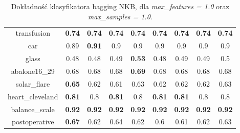 \begin{table}[H]
\begin{center}
{\begin{tabular}{c|cccccccc}
				transfusion&\textbf{0.74}&\textbf{0.74}&\textbf{0.74}&\textbf{0.74}&\textbf{0.74}&\textbf{0.74}&\textbf{0.74}&\textbf{0.74}\\%
				
				car&0.89&\textbf{0.91}&0.9&0.9&0.9&0.9&0.9&0.9\\%
				
				glass&0.48&0.48&0.49&\textbf{0.53}&0.48&0.49&0.49&0.5\\%
				
				abalone16\_29&0.68&0.68&0.68&\textbf{0.69}&0.68&0.68&0.68&0.68\\%
				
				solar\_flare&\textbf{0.65}&0.62&0.61&0.63&0.62&0.62&0.62&0.63\\%
				
				heart\_cleveland&\textbf{0.81}&0.8&\textbf{0.81}&0.8&\textbf{0.81}&\textbf{0.81}&0.8&0.8\\%
				
				balance\_scale&\textbf{0.92}&\textbf{0.92}&\textbf{0.92}&\textbf{0.92}&\textbf{0.92}&\textbf{0.92}&\textbf{0.92}&\textbf{0.92}\\%
				
				postoperative&\textbf{0.67}&0.62&0.64&0.62&0.6&0.61&0.62&0.63\\%
				
			\end{tabular}}
			\caption{Dokładność klasyfikatora bagging NKB, dla \textit{max\_features = 1.0} oraz \textit{max\_samples = 1.0}.}
			\label{bagging_11}
		\end{center}
	\end{table}
